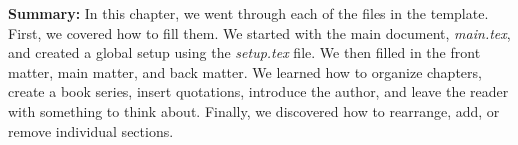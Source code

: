 \textbf{Summary:} In this chapter, we went through each of the files in the template. First, we covered how to fill them. We started with the main document, \textit{main.tex}, and created a global setup using the \textit{setup.tex} file. We then filled in the front matter, main matter, and back matter. We learned how to organize chapters, create a book series, insert quotations, introduce the author, and leave the reader with something to think about. Finally, we discovered how to rearrange, add, or remove individual sections.